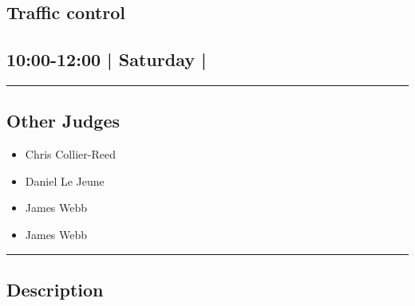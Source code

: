 \documentclass[10pt, A5]{article}
\begin{document}
		\begin{framed}
			\begin{minipage}{\textwidth}

			\setcounter{section}{15}
							\section{Traffic control}
						
			\subsection*{10:00-12:00 | Saturday | }

			\vspace{0.25cm}
			\hrule
			\vspace{0.25cm}


			\subsection*{Other Judges}
							

				\begin{multicols}{2}

			\begin{itemize}
											\item Chris Collier-Reed
											\item Daniel Le Jeune
											\item James Webb
								\end{itemize}

			\vfill\null
			\columnbreak

			\begin{itemize}
											\item James Webb
								\end{itemize}

			\vfill\null

			\end{multicols}

			\vspace{0.25cm}
			\hrule
			\vspace{0.25cm}

			\begin{minipage}{\textwidth}
			\subsection*{\faListAlt \: Description}
			
			\end{minipage}


	\end{minipage}
	\end{framed}
\end{document}
